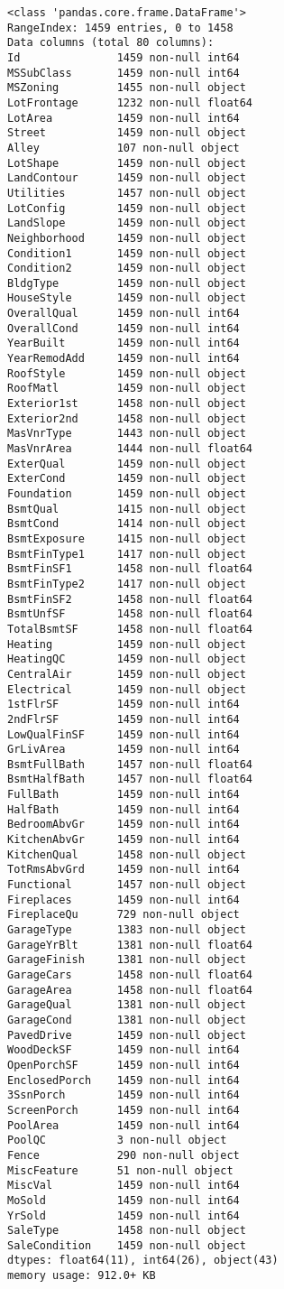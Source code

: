 \documentclass[11pt]{article}
\begin{document}
    \begin{Verbatim}[commandchars=\\\{\}]
<class 'pandas.core.frame.DataFrame'>
RangeIndex: 1459 entries, 0 to 1458
Data columns (total 80 columns):
Id               1459 non-null int64
MSSubClass       1459 non-null int64
MSZoning         1455 non-null object
LotFrontage      1232 non-null float64
LotArea          1459 non-null int64
Street           1459 non-null object
Alley            107 non-null object
LotShape         1459 non-null object
LandContour      1459 non-null object
Utilities        1457 non-null object
LotConfig        1459 non-null object
LandSlope        1459 non-null object
Neighborhood     1459 non-null object
Condition1       1459 non-null object
Condition2       1459 non-null object
BldgType         1459 non-null object
HouseStyle       1459 non-null object
OverallQual      1459 non-null int64
OverallCond      1459 non-null int64
YearBuilt        1459 non-null int64
YearRemodAdd     1459 non-null int64
RoofStyle        1459 non-null object
RoofMatl         1459 non-null object
Exterior1st      1458 non-null object
Exterior2nd      1458 non-null object
MasVnrType       1443 non-null object
MasVnrArea       1444 non-null float64
ExterQual        1459 non-null object
ExterCond        1459 non-null object
Foundation       1459 non-null object
BsmtQual         1415 non-null object
BsmtCond         1414 non-null object
BsmtExposure     1415 non-null object
BsmtFinType1     1417 non-null object
BsmtFinSF1       1458 non-null float64
BsmtFinType2     1417 non-null object
BsmtFinSF2       1458 non-null float64
BsmtUnfSF        1458 non-null float64
TotalBsmtSF      1458 non-null float64
Heating          1459 non-null object
HeatingQC        1459 non-null object
CentralAir       1459 non-null object
Electrical       1459 non-null object
1stFlrSF         1459 non-null int64
2ndFlrSF         1459 non-null int64
LowQualFinSF     1459 non-null int64
GrLivArea        1459 non-null int64
BsmtFullBath     1457 non-null float64
BsmtHalfBath     1457 non-null float64
FullBath         1459 non-null int64
HalfBath         1459 non-null int64
BedroomAbvGr     1459 non-null int64
KitchenAbvGr     1459 non-null int64
KitchenQual      1458 non-null object
TotRmsAbvGrd     1459 non-null int64
Functional       1457 non-null object
Fireplaces       1459 non-null int64
FireplaceQu      729 non-null object
GarageType       1383 non-null object
GarageYrBlt      1381 non-null float64
GarageFinish     1381 non-null object
GarageCars       1458 non-null float64
GarageArea       1458 non-null float64
GarageQual       1381 non-null object
GarageCond       1381 non-null object
PavedDrive       1459 non-null object
WoodDeckSF       1459 non-null int64
OpenPorchSF      1459 non-null int64
EnclosedPorch    1459 non-null int64
3SsnPorch        1459 non-null int64
ScreenPorch      1459 non-null int64
PoolArea         1459 non-null int64
PoolQC           3 non-null object
Fence            290 non-null object
MiscFeature      51 non-null object
MiscVal          1459 non-null int64
MoSold           1459 non-null int64
YrSold           1459 non-null int64
SaleType         1458 non-null object
SaleCondition    1459 non-null object
dtypes: float64(11), int64(26), object(43)
memory usage: 912.0+ KB


\end{Verbatim}
\end{document}
